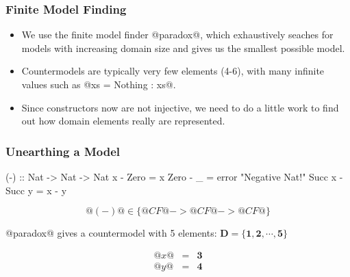 \documentclass[serif,professionalfont]{beamer}
\begin{document}
\begin{frame}
  \frametitle{Finite Model Finding}

  \begin{itemize}

    \item We use the finite model finder @paradox@, which exhaustively
      seaches for models with increasing domain size and gives us the
      smallest possible model.

    \item Countermodels are typically very few elements (4-6), with many
      infinite values such as @xs = Nothing : xs@.

    \item Since constructors now are not injective, we need to do a
      little work to find out how domain elements really are
      represented.

  \end{itemize}

\end{frame}

\begin{frame}[fragile]
  \frametitle{Unearthing a Model}

    \begin{code}
        (-) :: Nat -> Nat -> Nat
        x      - Zero   = x
        Zero   - _      = error "Negative Nat!"
        Succ x - Succ y = x - y
    \end{code}
    $$@(-)@ \in \{ @CF@ -> @CF@ -> @CF@ \}$$

    @paradox@ gives a countermodel with 5 elements:
    $\mathbf{D} = \{\mathbf{1} , \mathbf{2} , \cdots , \mathbf{5}\}$

\pause

\[\begin{array}{rcl}
@x@ & = & \mathbf{3} \\
@y@ & = & \mathbf{4}
\end{array}\]

\end{frame}
\end{document}
